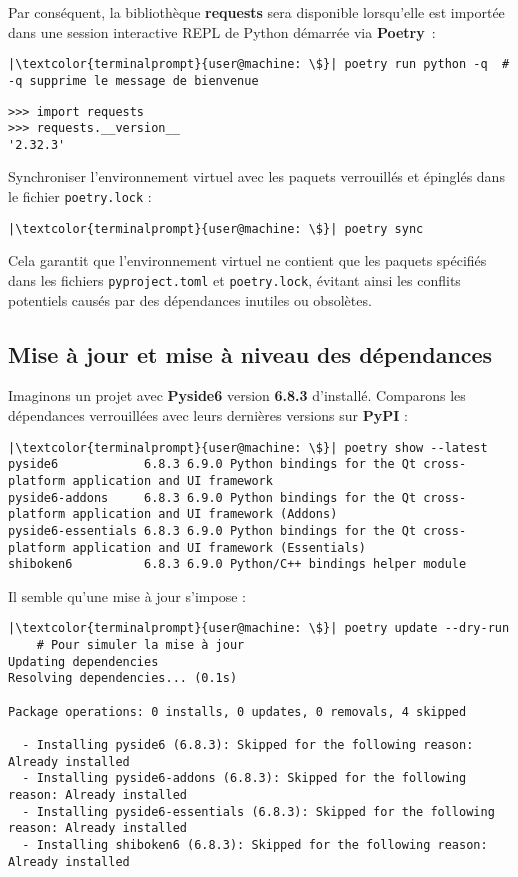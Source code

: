Par conséquent, la bibliothèque \textbf{requests} sera disponible lorsqu'elle est importée dans une session interactive REPL de Python démarrée via \textbf{Poetry} :
\begin{lstlisting}[style=terminal]
|\textcolor{terminalprompt}{user@machine: \$}| poetry run python -q  # -q supprime le message de bienvenue
\end{lstlisting}

\begin{verbatim}
>>> import requests
>>> requests.__version__
'2.32.3'
\end{verbatim}

Synchroniser l'environnement virtuel avec les paquets verrouillés et épinglés dans le fichier \texttt{poetry.lock} : 
\begin{lstlisting}[style=terminal]
|\textcolor{terminalprompt}{user@machine: \$}| poetry sync
\end{lstlisting}

Cela garantit que l'environnement virtuel ne contient que les paquets spécifiés dans les fichiers \texttt{pyproject.toml} et \texttt{poetry.lock}, évitant ainsi les conflits potentiels causés par des dépendances inutiles ou obsolètes.

\subsection*{Mise à jour et mise à niveau des dépendances}
Imaginons un projet avec \textbf{Pyside6} version \textbf{6.8.3} d'installé. Comparons les dépendances verrouillées avec leurs dernières versions sur \textbf{PyPI} :
\begin{lstlisting}[style=terminal]
|\textcolor{terminalprompt}{user@machine: \$}| poetry show --latest
pyside6            6.8.3 6.9.0 Python bindings for the Qt cross-platform application and UI framework
pyside6-addons     6.8.3 6.9.0 Python bindings for the Qt cross-platform application and UI framework (Addons)
pyside6-essentials 6.8.3 6.9.0 Python bindings for the Qt cross-platform application and UI framework (Essentials)
shiboken6          6.8.3 6.9.0 Python/C++ bindings helper module
\end{lstlisting}

Il semble qu'une mise à jour s'impose :
\begin{lstlisting}[style=terminal]
|\textcolor{terminalprompt}{user@machine: \$}| poetry update --dry-run  
    # Pour simuler la mise à jour
Updating dependencies
Resolving dependencies... (0.1s)

Package operations: 0 installs, 0 updates, 0 removals, 4 skipped

  - Installing pyside6 (6.8.3): Skipped for the following reason: Already installed
  - Installing pyside6-addons (6.8.3): Skipped for the following reason: Already installed
  - Installing pyside6-essentials (6.8.3): Skipped for the following reason: Already installed
  - Installing shiboken6 (6.8.3): Skipped for the following reason: Already installed
\end{lstlisting}

